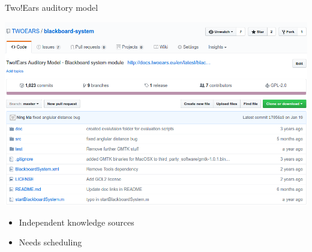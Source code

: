 \documentclass{beamer}
\begin{document}
\begin{frame}{Two!Ears auditory model}
\begin{minipage}[b]{0.56\columnwidth}
        \centering
        \includegraphics[width=.9\textwidth]{fig/blackboard-system}

        \begin{itemize}
            \item Independent knowledge sources
            \item Needs scheduling
        \end{itemize}

    \end{minipage}

\end{frame}
\end{document}
